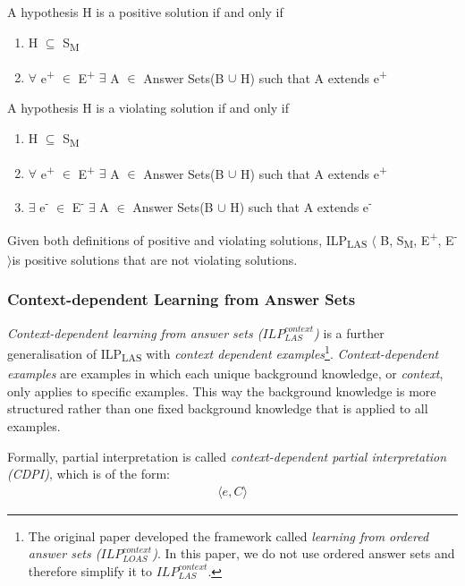 \documentclass[11pt,twoside]{report}
\theoremstyle{plain}
\theoremstyle{definition}
\begin{document}
A hypothesis H is a positive solution if and only if
\begin{enumerate}
\item H $\subseteq$ S\textsubscript{M}
\item $\forall$ e\textsuperscript{+} $\in$ E\textsuperscript{+} $\exists$ A $\in$ Answer Sets(B $\cup$ H) such that A extends e\textsuperscript{+}
\end{enumerate}
A hypothesis H is a violating solution if and only if
\begin{enumerate}
\item H $\subseteq$ S\textsubscript{M}
\item $\forall$ e\textsuperscript{+} $\in$ E\textsuperscript{+} $\exists$ A $\in$ Answer Sets(B $\cup$ H) such that A extends e\textsuperscript{+}
\item $\exists$ e\textsuperscript{-} $\in$ E\textsuperscript{-} $\exists$ A $\in$ Answer Sets(B $\cup$ H) such that A extends e\textsuperscript{-}\\
\end{enumerate}

Given both definitions of positive and violating solutions, ILP\textsubscript{LAS} $\langle$ B, S\textsubscript{M}, E\textsuperscript{+}, E\textsuperscript{-} $\rangle$is positive solutions that are not violating solutions.

\subsubsection{Context-dependent Learning from Answer Sets }
\textit{Context-dependent learning from answer sets ($ILP_{LAS}^{context}$)} is a further generalisation of ILP\textsubscript{LAS} with \textit{context dependent examples}\cite{Law2016}\footnote{The original paper developed the framework called \textit{learning from ordered answer sets ($ILP_{LOAS}^{context}$)}. 
In this paper, we do not use ordered answer sets and therefore simplify it to $ILP_{LAS}^{context}$. }.
\textit{Context-dependent examples} are examples in which each unique background knowledge, or \textit{context}, only applies to specific examples. 
This way the background knowledge is more structured rather than one fixed background knowledge that is applied to all examples.

Formally, partial interpretation is called \textit{context-dependent partial interpretation (CDPI)}, which is of the form:
\begin{equation} \label{eq:cdpi}
\begin{split}
\langle e, C \rangle
\end{split}
\end{equation}
\end{document}
